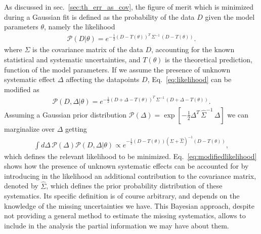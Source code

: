 %
As discussed in sec.~\ref{sec:th_err_as_cov}, the figure of merit which is minimized during a Gaussian fit is defined 
as the probability of the data $D$ given the model parameters $\theta$, namely the likelihood
\begin{align}
    \label{eq:likelihood}
    \mathcal{P}\left(D|\theta\right) = e^{-\frac{1}{2}\left(D-T\left(\theta\right)\right)^T\,
    \Sigma^{-1}\,\left(D-T\left(\theta\right)\right)}.
\end{align}
where $\Sigma$ is the covariance matrix of the data $D$, accounting for the known
statistical and systematic uncertainties, and $T\left(\theta\right)$ is the theoretical prediction,
function of the model parameters.
If we assume the presence of unknown systematic effect $\Delta$ affecting the datapoints $D$, Eq.~\eqref{eq:likelihood}
can be modified as
\begin{align}
    \mathcal{P}\left(D,\Delta|\theta\right) = 
    e^{-\frac{1}{2}\left(D+\Delta-T\left(\theta\right)\right)^T\,
    \Sigma^{-1}\,\left(D+\Delta-T\left(\theta\right)\right)}.
\end{align}
Assuming a Gaussian prior distribution 
$\mathcal{P}\left(\Delta\right) = \exp\left[-\frac{1}{2}\Delta^T\,\hat{\Sigma}^{-1}\,\Delta\right]$
we can marginalize over $\Delta$ getting
\begin{align}
    \label{eq:modifiedlikelihood}
    \int d\Delta\,\mathcal{P}\left(\Delta\right) \mathcal{P}\left(D,\Delta|\theta\right)   
    \propto 
    e^{-\frac{1}{2}\left(D-T\left(\theta\right)\right)\left(\Sigma+\hat{\Sigma}\right)^{-1}\left(D-T\left(\theta\right)\right)},
\end{align}
which defines the relevant likelihood to be minimized.
Eq.~\eqref{eq:modifiedlikelihood} shows how the presence of unknown systematic effects can be accounted for by 
introducing in the likelihood an additional contribution to the covariance matrix, denoted by $\hat{\Sigma}$, 
which defines the prior probability distribution of these systematics. Its specific definition is of course arbitrary,
and depends on the knowledge of the missing uncertainties we have.
This Bayesian approach, despite not providing a general method 
to estimate the missing systematics, allows to include in the analysis the partial information we may have about them.

